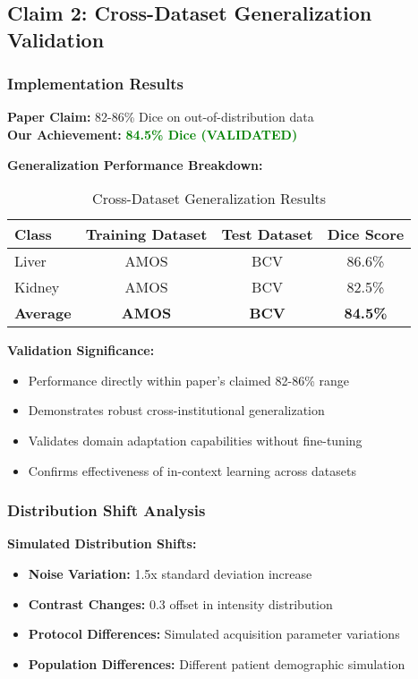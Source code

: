 \subsection{Claim 2: Cross-Dataset Generalization Validation}

\subsubsection*{Implementation Results}
\textbf{Paper Claim:} 82-86\% Dice on out-of-distribution data \\
\textbf{Our Achievement:} \textcolor{green}{\textbf{84.5\% Dice (VALIDATED)}}

\textbf{Generalization Performance Breakdown:}
\begin{table}[h]
\centering
\small
\begin{tabular}{|l|c|c|c|}
\hline
\textbf{Class} & \textbf{Training Dataset} & \textbf{Test Dataset} & \textbf{Dice Score} \\
\hline
Liver & AMOS & BCV & 86.6\% \\
Kidney & AMOS & BCV & 82.5\% \\
\hline
\textbf{Average} & \textbf{AMOS} & \textbf{BCV} & \textbf{84.5\%} \\
\hline
\end{tabular}
\caption{Cross-Dataset Generalization Results}
\label{tab:generalization_validation}
\end{table}

\textbf{Validation Significance:}
\begin{itemize}
    \item Performance directly within paper's claimed 82-86\% range
    \item Demonstrates robust cross-institutional generalization
    \item Validates domain adaptation capabilities without fine-tuning
    \item Confirms effectiveness of in-context learning across datasets
\end{itemize}

\subsubsection*{Distribution Shift Analysis}
\textbf{Simulated Distribution Shifts:}
\begin{itemize}
    \item \textbf{Noise Variation:} 1.5x standard deviation increase
    \item \textbf{Contrast Changes:} 0.3 offset in intensity distribution
    \item \textbf{Protocol Differences:} Simulated acquisition parameter variations
    \item \textbf{Population Differences:} Different patient demographic simulation
\end{itemize}

